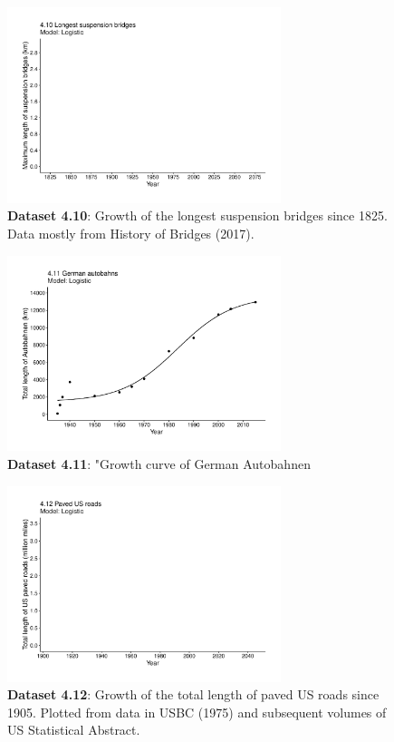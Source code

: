 \documentclass[aps,rmp,preprint,superscriptaddress,10pt,onecolumn]{article}
\begin{document}
\begin{figure}[h]
\includegraphics[width=8cm]{output/figs-ggplot/4.10.pdf}
\caption{\textbf{Dataset 4.10}: Growth of the longest suspension bridges since 1825. Data mostly from History of Bridges (2017).}
\end{figure}
	
\begin{figure}[h]
\includegraphics[width=8cm]{output/figs-ggplot/4.11.pdf}
\caption{\textbf{Dataset 4.11}: "Growth curve of German Autobahnen}
\end{figure}
	
\begin{figure}[h]
\includegraphics[width=8cm]{output/figs-ggplot/4.12.pdf}
\caption{\textbf{Dataset 4.12}: Growth of the total length of paved US roads since 1905. Plotted from data in USBC (1975) and subsequent volumes of US Statistical Abstract.}
\end{figure}
	
\end{document}
